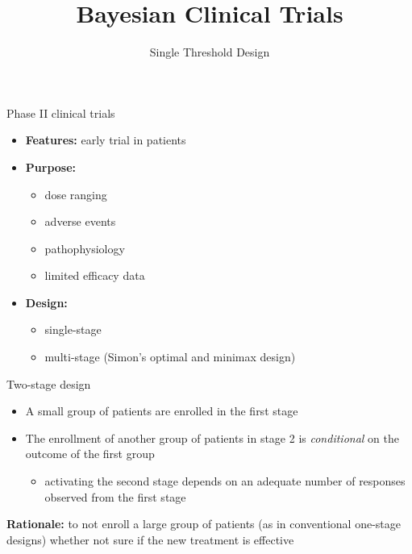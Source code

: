 \documentclass{beamer}
\title[]{Bayesian Clinical Trials}
\subtitle{Single Threshold Design}
\date{}
\begin{document}
\begin{frame}
\titlepage %
\end{frame}


\begin{frame}{Phase II clinical trials}

\begin{itemize}
\itemsep1pt\parskip0pt
\item
  \textbf{Features:} early trial in patients
\item
  \textbf{Purpose:}

  \begin{itemize}
  \itemsep1pt\parskip0pt
  \item
    dose ranging
  \item
    adverse events
  \item
    pathophysiology
  \item
    limited efficacy data
  \end{itemize}
\item
  \textbf{Design:}

  \begin{itemize}
  \itemsep1pt\parskip0pt
  \item
    single-stage
  \item
    multi-stage (Simon's optimal and minimax design)
  \end{itemize}
\end{itemize}

\end{frame}




\begin{frame}{Two-stage design}

\begin{itemize}
\itemsep1pt\parskip0pt
\item
  A small group of patients are enrolled in the first stage
\item
  The enrollment of another group of patients in stage 2 is
  \emph{conditional} on the outcome of the first group

  \begin{itemize}
  \itemsep1pt\parskip0pt
  \item
    activating the second stage depends on an adequate number of
    responses observed from the first stage
  \end{itemize}
\end{itemize}

 \textbf{Rationale:} to not enroll a large group of patients (as in
conventional one-stage designs) whether not sure if the new treatment is
effective

\end{frame}
\end{document}
